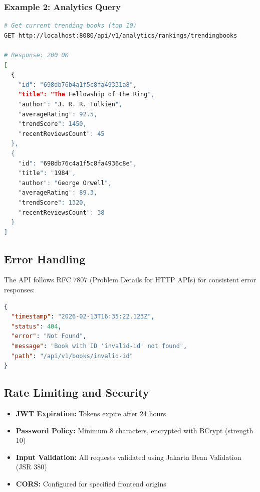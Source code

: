 \subsubsection{Example 2: Analytics Query}
\begin{lstlisting}[language=bash, caption={Trending Books Analytics API}]
# Get current trending books (top 10)
GET http://localhost:8080/api/v1/analytics/rankings/trendingbooks

# Response: 200 OK
[
  {
    "id": "698db76b4a1f5c8fa49331a8",
    "title": "The Fellowship of the Ring",
    "author": "J. R. R. Tolkien",
    "averageRating": 92.5,
    "trendScore": 1450,
    "recentReviewsCount": 45
  },
  {
    "id": "698db76c4a1f5c8fa4936c8e",
    "title": "1984",
    "author": "George Orwell",
    "averageRating": 89.3,
    "trendScore": 1320,
    "recentReviewsCount": 38
  }
]
\end{lstlisting}

\subsection{Error Handling}
The API follows RFC 7807 (Problem Details for HTTP APIs) for consistent error responses:

\begin{lstlisting}[language=json, caption={Example Error Response}]
{
  "timestamp": "2026-02-13T16:35:22.123Z",
  "status": 404,
  "error": "Not Found",
  "message": "Book with ID 'invalid-id' not found",
  "path": "/api/v1/books/invalid-id"
}
\end{lstlisting}

\subsection{Rate Limiting and Security}
\begin{itemize}
    \item \textbf{JWT Expiration:} Tokens expire after 24 hours
    \item \textbf{Password Policy:} Minimum 8 characters, encrypted with BCrypt (strength 10)
    \item \textbf{Input Validation:} All requests validated using Jakarta Bean Validation (JSR 380)
    \item \textbf{CORS:} Configured for specified frontend origins
\end{itemize}